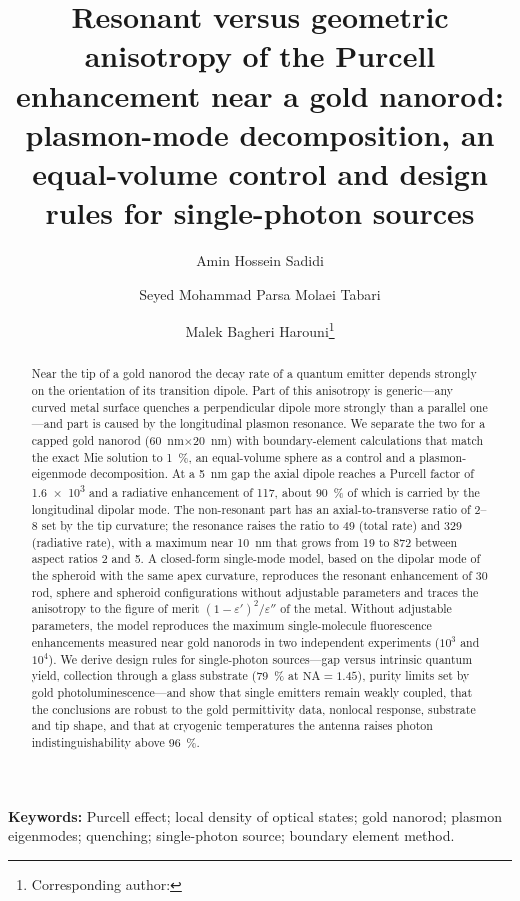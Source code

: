 \documentclass[11pt,a4paper]{article}
\title{Resonant versus geometric anisotropy of the Purcell enhancement near a gold nanorod:\\
plasmon-mode decomposition, an equal-volume control and design rules for single-photon sources}
\author[1]{Amin Hossein Sadidi}
\author[1]{Seyed Mohammad Parsa Molaei Tabari}
\author[1]{Malek Bagheri Harouni\thanks{Corresponding author: \TBD{e-mail}}}
\affil[1]{Department of Physics, Faculty of Science, University of Isfahan, Isfahan, Iran}
\date{}
\begin{document}
\maketitle

\begin{abstract}
Near the tip of a gold nanorod the decay rate of a quantum emitter depends strongly on the orientation of its
transition dipole. Part of this anisotropy is generic---any curved metal surface quenches a perpendicular dipole more
strongly than a parallel one---and part is caused by the longitudinal plasmon resonance. We separate the two for a
capped gold nanorod (\SI{60}{nm}$\times$\SI{20}{nm}) with boundary-element calculations that match the exact Mie
solution to \SI{1}{\percent}, an equal-volume sphere as a control and a plasmon-eigenmode decomposition. At a
\SI{5}{nm} gap the axial dipole reaches a Purcell factor of \num{1.6e3} and a radiative enhancement of 117, about
\SI{90}{\percent} of which is carried by the longitudinal dipolar mode. The non-resonant part has an axial-to-transverse
ratio of 2--8 set by the tip curvature; the resonance raises the ratio to 49 (total rate) and 329 (radiative rate),
with a maximum near \SI{10}{nm} that grows from 19 to 872 between aspect ratios 2 and 5. A closed-form single-mode
model, based on the dipolar mode of the spheroid with the same apex curvature, reproduces the resonant enhancement of
30 rod, sphere and spheroid configurations without adjustable parameters and traces the anisotropy to the figure of merit
$(1-\varepsilon')^2/\varepsilon''$ of the metal. Without adjustable parameters, the model reproduces the maximum single-molecule fluorescence
enhancements measured near gold nanorods in two independent experiments ($10^3$ and $10^4$). We derive design rules for single-photon sources---gap versus intrinsic
quantum yield, collection through a glass substrate (\SI{79}{\percent} at $\mathrm{NA}=1.45$), purity limits set by
gold photoluminescence---and show that single emitters remain weakly coupled, that the conclusions are robust to the
gold permittivity data, nonlocal response, substrate and tip shape, and that at cryogenic temperatures the antenna
raises photon indistinguishability above \SI{96}{\percent}.
\end{abstract}

\noindent\textbf{Keywords:} Purcell effect; local density of optical states; gold nanorod; plasmon eigenmodes;
quenching; single-photon source; boundary element method.

\end{document}
